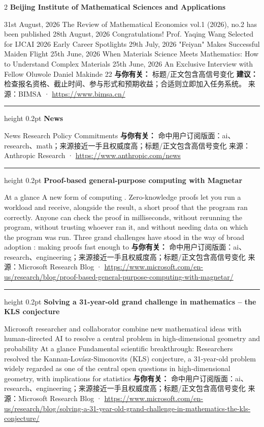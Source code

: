 \documentclass[10.5pt]{ctexart}
\begin{document}
\begin{multicols}{2}
{\large\bfseries Beijing Institute of Mathematical Sciences and Applications}\par
31st August, 2026 The Review of Mathematical Economics vol.1 (2026), no.2 has been published 28th August, 2026 Congratulations! Prof. Yaqing Wang Selected for IJCAI 2026 Early Career Spotlights 29th July, 2026 "Feiyan" Makes Successful Maiden Flight 25th June, 2026 When Materials Science Meets Mathematics: How to Understand Complex Materials 25th June, 2026 An Exclusive Interview with Fellow Oluwole Daniel Makinde 22
\textbf{与你有关：} 标题/正文包含高信号变化
\textbf{建议：} 检查报名资格、截止时间、参与形式和预期收益；合适则立即加入任务系统。
{\footnotesize\color{ormuted} 来源：BIMSA · \url{https://www.bimsa.cn/}}
\vspace{2mm}
\hrule height 0.2pt
\vspace{2mm}
{\large\bfseries News}\par
News Research Policy Commitments
\textbf{与你有关：} 命中用户订阅版面：ai、research、math；来源接近一手且权威度高；标题/正文包含高信号变化
{\footnotesize\color{ormuted} 来源：Anthropic Research · \url{https://www.anthropic.com/news}}
\vspace{2mm}
\hrule height 0.2pt
\vspace{2mm}
{\large\bfseries Proof-based general-purpose computing with Magnetar}\par
At a glance A new form of computing . Zero-knowledge proofs let you run a workload and receive, alongside the result, a short proof that the program ran correctly. Anyone can check the proof in milliseconds, without rerunning the program, without trusting whoever ran it, and without needing data on which the program was run. Three grand challenges have stood in the way of broad adoption : making proofs fast enough to
\textbf{与你有关：} 命中用户订阅版面：ai、research、engineering；来源接近一手且权威度高；标题/正文包含高信号变化
{\footnotesize\color{ormuted} 来源：Microsoft Research Blog · \url{https://www.microsoft.com/en-us/research/blog/proof-based-general-purpose-computing-with-magnetar/}}
\vspace{2mm}
\hrule height 0.2pt
\vspace{2mm}
{\large\bfseries Solving a 31-year-old grand challenge in mathematics – the KLS conjecture}\par
Microsoft researcher and collaborator combine new mathematical ideas with human-directed AI to resolve a central problem in high-dimensional geometry and probability At a glance Fundamental scientific breakthrough: Researchers resolved the Kannan-Lovász-Simonovits (KLS) conjecture, a 31-year-old problem widely regarded as one of the central open questions in high-dimensional geometry, with implications for statistics
\textbf{与你有关：} 命中用户订阅版面：ai、research、engineering；来源接近一手且权威度高；标题/正文包含高信号变化
{\footnotesize\color{ormuted} 来源：Microsoft Research Blog · \url{https://www.microsoft.com/en-us/research/blog/solving-a-31-year-old-grand-challenge-in-mathematics-the-kls-conjecture/}}
\end{multicols}
\end{document}
